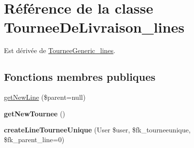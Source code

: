 \hypertarget{classTourneeDeLivraison__lines}{}\section{Référence de la classe Tournee\+De\+Livraison\+\_\+lines}
\label{classTourneeDeLivraison__lines}


Est dérivée de \hyperlink{classTourneeGeneric__lines}{Tournee\+Generic\+\_\+lines}.

\subsection*{Fonctions membres publiques}
\begin{DoxyCompactItemize}
\item 
\hyperlink{classTourneeDeLivraison__lines_ab3ec0d9eca1e1d4d9fcfc88a73293f64}{get\+New\+Line} (\$parent=null)
\item 
\mbox{\label{classTourneeDeLivraison__lines_a5dfa3d6586d89683384c3732de343ac8}} 
{\bfseries get\+New\+Tournee} ()
\item 
\mbox{\label{classTourneeDeLivraison__lines_ade340211d83b8e9481e142d5b9ceee5f}} 
{\bfseries create\+Line\+Tournee\+Unique} (User \$user, \$fk\+\_\+tourneeunique, \$fk\+\_\+parent\+\_\+line=0)
\end{DoxyCompactItemize}
